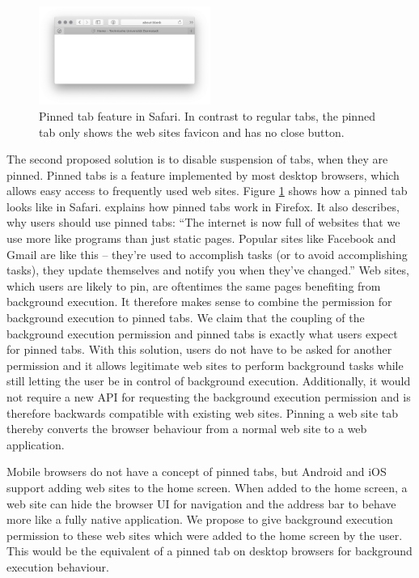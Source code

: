 \documentclass[
	ruledheaders=section,%
	class=report,%
	thesis={type=bachelor},%
	accentcolor=9c,%
	custommargins=true,%
	marginpar=false,%
	parskip=half-,%
	fontsize=11pt,%
]{tudapub}
\begin{document}
  \begin{figure}
    \centering
    \includegraphics[width=0.5\textwidth]{images/pinned-tab.png}
    \caption{Pinned tab feature in Safari. In contrast to regular tabs, the pinned tab only shows the web sites favicon and has no close button.}
    \label{fig:pinned-tab}
  \end{figure}
  
  The second proposed solution is to disable suspension of tabs, when they are pinned. Pinned tabs is a feature implemented by most desktop browsers, which allows easy access to frequently used web sites. Figure \ref{fig:pinned-tab} shows how a pinned tab looks like in Safari. \cite{firefox-pinned-tabs} explains how pinned tabs work in Firefox. It also describes, why users should use pinned tabs: ``The internet is now full of websites that we use more like programs than just static pages. Popular sites like Facebook and Gmail are like this – they're used to accomplish tasks (or to avoid accomplishing tasks), they update themselves and notify you when they've changed.'' Web sites, which users are likely to pin, are oftentimes the same pages benefiting from background execution. It therefore makes sense to combine the permission for background execution to pinned tabs. We claim that the coupling of the background execution permission and pinned tabs is exactly what users expect for pinned tabs. With this solution, users do not have to be asked for another permission and it allows legitimate web sites to perform background tasks while still letting the user be in control of background execution. Additionally, it would not require a new API for requesting the background execution permission and is therefore backwards compatible with existing web sites. Pinning a web site tab thereby converts the browser behaviour from a normal web site to a web application.

  Mobile browsers do not have a concept of pinned tabs, but Android and iOS support adding web sites to the home screen. When added to the home screen, a web site can hide the browser UI for navigation and the address bar to behave more like a fully native application. We propose to give background execution permission to these web sites which were added to the home screen by the user. This would be the equivalent of a pinned tab on desktop browsers for background execution behaviour.
  
  
  \newpage
  \printbibliography[heading=bibnumbered]


  \affidavit
\end{document}
